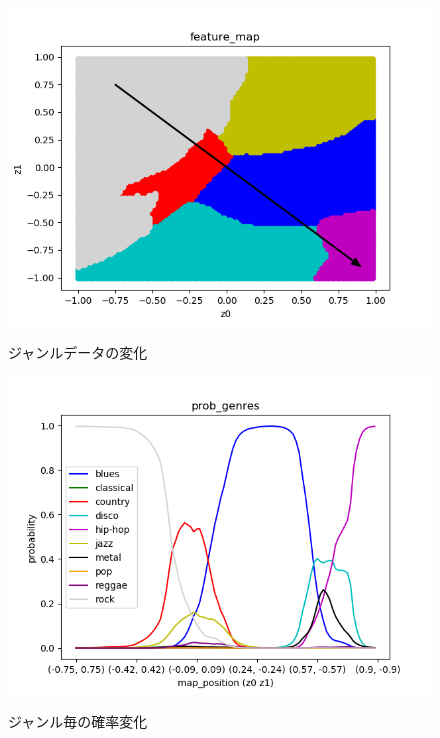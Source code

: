 \newpage
\begin{figure}[htbp]
	\begin{center}
		\includegraphics[scale=0.8]{./images/visualize/map_trans.png}
		\caption{ジャンルデータの変化}
		\label{fig:featmap-trans}
		\includegraphics[scale=0.8]{./images/visualize/prob_trans.png}
		\caption{ジャンル毎の確率変化}
		\label{fig:prob-trans}
	\end{center}
\end{figure}

